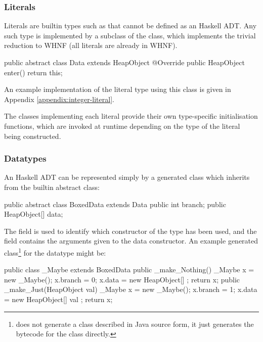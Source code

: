 \documentclass[dissertation.tex]{subfiles}
\begin{document}
{{        \subsubsection{Literals}\label{sec:literals}
        {
            Literals are builtin types such as  that cannot be defined as an Haskell ADT. Any such type is implemented by a subclass of the  class, which implements the trivial reduction to WHNF (all literals are already in WHNF).

            \begin{javafigure}
            public abstract class Data extends HeapObject {
                @Override
                public HeapObject enter() {
                    return this;
                }
            }
            \end{javafigure}

            An example implementation of the  literal type using this class is given in Appendix \ref{appendix:integer-literal}.

            The classes implementing each literal provide their own type-specific initialisation functions, which are invoked at runtime depending on the type of the literal being constructed.
        }
        \subsubsection{Datatypes}
        {
            An Haskell ADT can be represented simply by a generated class which inherits from the  builtin abstract class:

            \begin{javafigure}
            public abstract class BoxedData extends Data {
                public int branch;
                public HeapObject[] data;
            }
            \end{javafigure}

            The  field is used to identify which constructor of the type has been used, and the  field contains the arguments given to the data constructor. An example generated class\footnote{\compilername does not generate a class described in Java source form, it just generates the bytecode for the class directly.} for the datatype  might be:

            \begin{javafigure}
            public class _Maybe extends BoxedData {
                public _make_Nothing() {
                    _Maybe x = new _Maybe();
                    x.branch = 0;
                    x.data = new HeapObject[] {};
                    return x;
                }
                public _make_Just(HeapObject val) {
                    _Maybe x = new _Maybe();
                    x.branch = 1;
                    x.data = new HeapObject[] { val };
                    return x;
                }
            }
            \end{javafigure}

}}}
\end{document}
